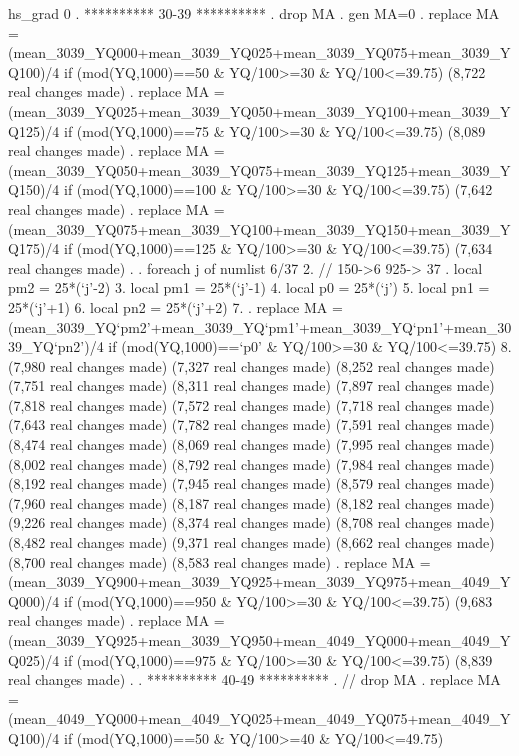      hs_grad {\VBAR}          0
{\smallskip}
. **********  30-39 **********
. drop MA
{\smallskip}
. gen MA=0
{\smallskip}
. replace MA = (mean_3039_YQ000+mean_3039_YQ025+mean_3039_YQ075+mean_3039_YQ100)/4 if (mod(YQ,1000)==50 \& YQ/100>=30 \& YQ/100<=39.75)
(8,722 real changes made)
{\smallskip}
. replace MA = (mean_3039_YQ025+mean_3039_YQ050+mean_3039_YQ100+mean_3039_YQ125)/4 if (mod(YQ,1000)==75 \& YQ/100>=30 \& YQ/100<=39.75)
(8,089 real changes made)
{\smallskip}
. replace MA = (mean_3039_YQ050+mean_3039_YQ075+mean_3039_YQ125+mean_3039_YQ150)/4 if (mod(YQ,1000)==100 \& YQ/100>=30 \& YQ/100<=39.75)
(7,642 real changes made)
{\smallskip}
. replace MA = (mean_3039_YQ075+mean_3039_YQ100+mean_3039_YQ150+mean_3039_YQ175)/4 if (mod(YQ,1000)==125 \& YQ/100>=30 \& YQ/100<=39.75)
(7,634 real changes made)
{\smallskip}
. 
. foreach j of numlist 6/37{\lbr}
  2.         // 150->6 925-> 37
.         local pm2 = 25*(`j'-2)
  3.         local pm1 = 25*(`j'-1)
  4.         local p0 = 25*(`j')
  5.         local pn1 = 25*(`j'+1)
  6.         local pn2 = 25*(`j'+2)
  7. 
.         replace MA = (mean_3039_YQ`pm2'+mean_3039_YQ`pm1'+mean_3039_YQ`pn1'+mean_3039_YQ`pn2')/4 if (mod(YQ,1000)==`p0' \& YQ/100>=30 \& YQ/100<=39.75)
  8. {\rbr}
(7,980 real changes made)
(7,327 real changes made)
(8,252 real changes made)
(7,751 real changes made)
(8,311 real changes made)
(7,897 real changes made)
(7,818 real changes made)
(7,572 real changes made)
(7,718 real changes made)
(7,643 real changes made)
(7,782 real changes made)
(7,591 real changes made)
(8,474 real changes made)
(8,069 real changes made)
(7,995 real changes made)
(8,002 real changes made)
(8,792 real changes made)
(7,984 real changes made)
(8,192 real changes made)
(7,945 real changes made)
(8,579 real changes made)
(7,960 real changes made)
(8,187 real changes made)
(8,182 real changes made)
(9,226 real changes made)
(8,374 real changes made)
(8,708 real changes made)
(8,482 real changes made)
(9,371 real changes made)
(8,662 real changes made)
(8,700 real changes made)
(8,583 real changes made)
{\smallskip}
. replace MA = (mean_3039_YQ900+mean_3039_YQ925+mean_3039_YQ975+mean_4049_YQ000)/4 if (mod(YQ,1000)==950 \& YQ/100>=30 \& YQ/100<=39.75)
(9,683 real changes made)
{\smallskip}
. replace MA = (mean_3039_YQ925+mean_3039_YQ950+mean_4049_YQ000+mean_4049_YQ025)/4 if (mod(YQ,1000)==975 \& YQ/100>=30 \& YQ/100<=39.75)
(8,839 real changes made)
{\smallskip}
. 
. **********  40-49 **********
. // drop MA
. replace MA = (mean_4049_YQ000+mean_4049_YQ025+mean_4049_YQ075+mean_4049_YQ100)/4 if (mod(YQ,1000)==50 \& YQ/100>=40 \& YQ/100<=49.75)
